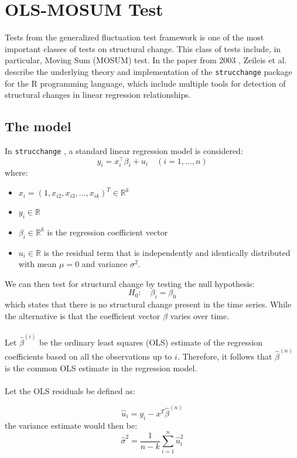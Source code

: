 \documentclass[main.tex]{subfiles}
\begin{document}
\section{OLS-MOSUM Test}
\label{sec:mosum}

Tests from the generalized fluctuation test framework \cite{kuan_hornik}
is one of the most important classes of tests on structural change. This class
of tests include, in particular, Moving Sum (MOSUM) test. In the paper from
2003 \cite{strucchange}, Zeileis et al. describe the underlying theory and
implementation of the \texttt{strucchange}
package for the R programming language, which include multiple tools for
detection of structural changes in linear regression relationships.

\subsection{The model}
\label{sec:mosum}
In \texttt{strucchange} \cite{strucchange}, a standard linear regression model is considered:
\[
y_{i}=x_{i}^{\top} \beta_{i}+u_{i} \quad(i=1, \ldots, n)
\]
where:
\begin{itemize}
\item $x_i = (1,x_{i2}, x_{i3}, ..., x_{ik})^T \in \mathbb{R}^k$
\item $y_i \in \mathbb{R}$
\item $\beta_i \in \mathbb{R}^{k} $ is the
  regression coefficient vector
\item $u_i \in \mathbb{R}$ is the residual term that is independently and identically
  distributed with mean $\mu = 0$ and variance $\sigma^2$.
\end{itemize}
We can then test for structural change by testing the null hypothesis:
\[
H_0:\quad \beta_i = \beta_0
\]
which states that there is no structural change present in the time series.
While the alternative is that the coefficient vector $\beta$ varies over time. \\\\
Let $\hat{\beta}^{(i)}$ be the ordinary least squares (OLS) estimate of the
regression coefficients based on all the observations up to $i$.
Therefore, it follows that $\hat{\beta}^{(n)}$ is the common OLS estimate in the regression model. \\\\
Let the OLS residuals be defined as:

\begin{equation} \label{eq:residuals}
\hat{u}_i = y_i - x^T\hat{\beta}^{(n)}
\end{equation}
the variance estimate would then be:
\begin{equation} \label{eq:sigma}
\hat{\sigma}^{2}=\frac{1}{n-k} \sum_{i=1}^{n} \hat{u}_{i}^{2}
\end{equation}
\end{document}
